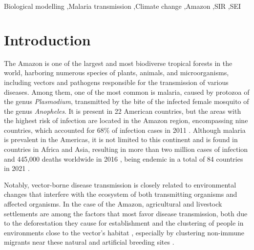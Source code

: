 \documentclass[a4paper,fleqn]{cas-dc}
\begin{document}





\begin{keywords}
Biological modelling \sep Malaria transmission \sep Climate change \sep Amazon \sep SIR \sep SEI
\end{keywords}


\maketitle

\section{Introduction}

The Amazon is one of the largest and most biodiverse tropical forests 
in the world, harboring numerous species of plants, animals, and 
microorganisms, including vectors and pathogens responsible for the 
transmission of various diseases. Among them, one of the most common 
is malaria, caused by protozoa of the genus \textit{Plasmodium}, 
transmitted by the bite of the infected female mosquito of the genus 
\textit{Anopheles}. It is present in 22 American countries, but the 
areas with the highest risk of infection are located in the Amazon 
region, encompassing nine countries, which accounted for $68\%$ of 
infection cases in 
2011 \cite{pimenta_orfano_bahia_duarte_rios-velasquez_melo_pessoa_oliveira_campos_villegas_etal_2015}. 
Although malaria is prevalent in the Americas, it is 
not limited to this continent and is found in countries in Africa and Asia, 
resulting in more than two million cases of infection and 445,000 deaths 
worldwide in 2016 \cite{regulation_of_sexual_commitment}, being endemic in a total of 84 countries in 2021 \cite{WHO2022}.

Notably, vector-borne disease transmission is closely related to 
environmental changes that interfere with the ecosystem of both 
transmitting organisms and affected organisms. In the case of the 
Amazon, agricultural and livestock settlements are among the factors
that most favor disease transmission, both due to the deforestation 
they cause for establishment and the clustering of people in environments 
close to the vector's habitat \cite{silva-nunes_malaria_amazon_2008}, 
especially by clustering non-immune migrants near these natural and 
artificial breeding sites \cite{DASILVANUNES2012281}.
\end{document}

